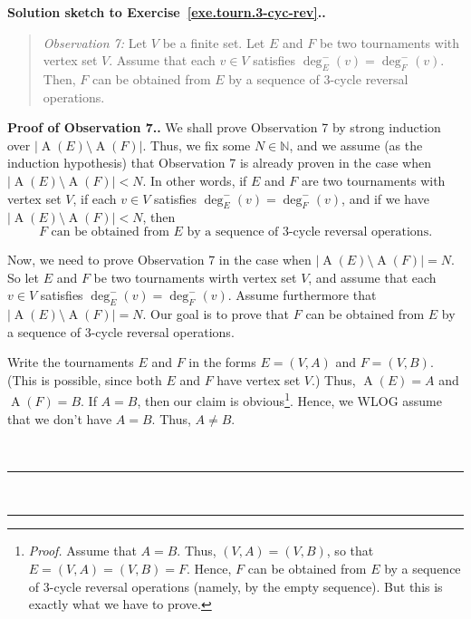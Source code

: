 \documentclass[numbers=enddot,12pt,final,onecolumn,notitlepage]{scrartcl}%
\theoremstyle{definition}
\newenvironment{statement}{\begin{quote}}{\end{quote}}
\newenvironment{proof}[1][Proof]{\noindent\textbf{#1.} }{\ \rule{0.5em}{0.5em}}
\newcommand{\NN}{\mathbb{N}}
\newcommand{\abs}[1]{\left| #1 \right|}
\newcommand{\tup}[1]{\left( #1 \right)}
\newcommand{\arcs}[1]{\operatorname{A}\left( #1 \right)}
\begin{document}
\begin{proof}[Solution sketch to Exercise~\ref{exe.tourn.3-cyc-rev}.]
\begin{statement}
\textit{Observation 7:} Let $V$ be a finite set. Let $E$ and $F$ be
two tournaments with vertex set $V$. Assume that
each $v \in V$ satisfies $\deg^-_E \tup{v} = \deg^-_F \tup{v}$.
Then, $F$ can be obtained
from $E$ by a sequence of $3$-cycle reversal operations.
\end{statement}

\begin{proof}[Proof of Observation 7.]
We shall prove Observation 7 by strong induction over
$\abs{\arcs{E} \setminus \arcs{F}}$. Thus, we fix some $N \in \NN$,
and we assume (as the induction hypothesis) that Observation 7 is
already proven in the case when
$\abs{\arcs{E} \setminus \arcs{F}} < N$. In other words, if $E$ and
$F$ are two tournaments with vertex set $V$, if each $v \in V$
satisfies $\deg^-_E \tup{v} = \deg^-_F \tup{v}$, and if we have
$\abs{\arcs{E} \setminus \arcs{F}} < N$, then
\begin{equation}
F \text{ can be obtained from } E
\text{ by a sequence of }3\text{-cycle reversal operations}.
\label{sol.tourn.3-cyc-rev.o7.pf.IH}
\end{equation}

Now, we need to prove Observation 7 in the case when
$\abs{\arcs{E} \setminus \arcs{F}} = N$.
So let $E$ and $F$ be two tournaments wirth vertex set $V$, and
assume that each $v \in V$ satisfies
$\deg^-_E \tup{v} = \deg^-_F \tup{v}$. Assume furthermore that
$\abs{\arcs{E} \setminus \arcs{F}} = N$.
Our goal is to prove that $F$ can be obtained
from $E$ by a sequence of $3$-cycle reversal operations.

Write the tournaments $E$ and $F$ in
the forms $E = \tup{V, A}$ and $F = \tup{V, B}$. (This is possible,
since both $E$ and $F$ have vertex set $V$.) Thus, $\arcs{E} = A$
and $\arcs{F} = B$.
If $A = B$, then
our claim is obvious\footnote{\textit{Proof.} Assume that
$A = B$. Thus, $\tup{V, A} = \tup{V, B}$, so that
$E = \tup{V, A} = \tup{V, B} = F$. Hence, $F$ can be obtained
from $E$ by a sequence of $3$-cycle reversal operations
(namely, by the empty sequence). But this is exactly what we have
to prove.}. Hence, we WLOG assume that we don't have $A = B$.
Thus, $A \neq B$.


\end{proof}
\end{proof}
\end{document}
